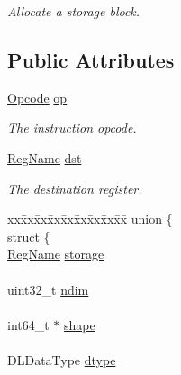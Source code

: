 \begin{DoxyCompactItemize}
\begin{DoxyCompactList}\small\item\em Allocate a storage block. \end{DoxyCompactList}\end{DoxyCompactItemize}
\subsection*{Public Attributes}
\begin{DoxyCompactItemize}
\item 
\hyperlink{namespacetvm_1_1runtime_1_1vm_a8d8d95ce8d629c7213f2f595917870ec}{Opcode} \hyperlink{structtvm_1_1runtime_1_1vm_1_1Instruction_aa16a3e7e4030a69da0def6465d65e745}{op}
\begin{DoxyCompactList}\small\item\em The instruction opcode. \end{DoxyCompactList}\item 
\hyperlink{namespacetvm_1_1runtime_1_1vm_a3bbbf700719e9dc3dda2bc25210c18ae}{Reg\+Name} \hyperlink{structtvm_1_1runtime_1_1vm_1_1Instruction_a17f056cc4798d31c8bcee6903be8dd1d}{dst}
\begin{DoxyCompactList}\small\item\em The destination register. \end{DoxyCompactList}\item 
\begin{tabbing}
xx\=xx\=xx\=xx\=xx\=xx\=xx\=xx\=xx\=\kill
union \{\\
\>struct \{\\
\>\>\hyperlink{namespacetvm_1_1runtime_1_1vm_a3bbbf700719e9dc3dda2bc25210c18ae}{RegName} \hyperlink{structtvm_1_1runtime_1_1vm_1_1Instruction_a3412cabd3b4f42f106f56fc22257f6ca}{storage}\\
\>\>\\
\>\>uint32\_t \hyperlink{structtvm_1_1runtime_1_1vm_1_1Instruction_a173d5883d5721b633350c0bfc24122b9}{ndim}\\
\>\>\\
\>\>int64\_t $\ast$ \hyperlink{structtvm_1_1runtime_1_1vm_1_1Instruction_a1354fe84e9c14c550a53f5de8f48d968}{shape}\\
\>\>\\
\>\>DLDataType \hyperlink{structtvm_1_1runtime_1_1vm_1_1Instruction_a91614b450055e58850c47949b3ed2714}{dtype}\\
\>\>\\

\end{tabbing}
\end{DoxyCompactItemize}
